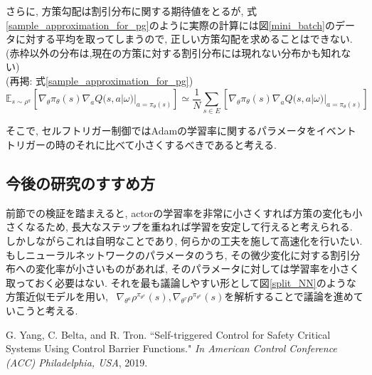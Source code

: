 \documentclass{jsarticle}
\newcommand{\expect}{\mathbb{E}}
\begin{document}
さらに, 方策勾配は割引分布に関する期待値をとるが, 式\eqref{sample_approximation_for_pg}のように実際の計算には図\ref{mini_batch}のデータに対する平均を取ってしまうので, 正しい方策勾配を求めることはできない.(赤枠以外の分布は,現在の方策に対する割引分布には現れない分布かも知れない)\\
(再掲: 式\eqref{sample_approximation_for_pg})
\begin{equation*}
	\expect_{s\sim\rho^{\pi}}[\nabla_{\theta}\pi_{\theta}(s)\nabla_{a}Q(s, a|\omega)|_{a=\pi_{\theta}(s)}] \simeq \frac{1}{N}\sum_{s\in E}[\nabla_{\theta}\pi_{\theta}(s)\nabla_{a}Q(s, a|\omega)|_{a=\pi_{\theta}(s)}] 
\end{equation*}
 \par
そこで, セルフトリガー制御ではAdamの学習率に関するパラメータをイベントトリガーの時のそれに比べて小さくするべきであると考える.\par


\subsection{今後の研究のすすめ方}
前節での検証を踏まえると, actorの学習率を非常に小さくすれば方策の変化も小さくなるため, 長大なステップを重ねれば学習を安定して行えると考えられる. 
しかしながらこれは自明なことであり, 何らかの工夫を施して高速化を行いたい. もしニューラルネットワークのパラメータのうち, その微少変化に対する割引分布への変化率が小さいものがあれば, そのパラメータに対しては学習率を小さく取っておく必要はない. それを最も議論しやすい形として図\ref{split_NN}のような方策近似モデルを用い, ~$\nabla_{\theta^a}\rho^{\pi_{\theta^{\pi}}}(s), \nabla_{\theta^{\tau}}\rho^{\pi_{\theta^{\pi}}}(s)$を解析することで議論を進めていこうと考える.




\begin{thebibliography}{10}
G. Yang, C. Belta, and R. Tron. “Self-triggered Control for Safety Critical Systems Using Control Barrier Functions."  \textit{In American Control Conference (ACC) Philadelphia, USA}, 2019.
 
 \end{thebibliography}
\end{document}
